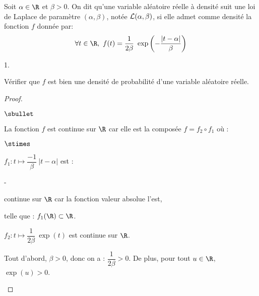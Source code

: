 \noindent 
Soit $\alpha\in\R$ et $\beta>0$. On dit qu'une variable aléatoire
réelle à densité suit une loi de Laplace de paramètre
$(\alpha,\beta)$, notée $\cal L(\alpha,\beta)$, si elle admet comme
densité la fonction $f$ donnée par:
\[
\forall t \in \R, \ f(t) = \dfrac{1}{2{\beta}} \ \exp\left(-
  \dfrac{|t-\alpha|}{\beta} \right)
\]
\begin{noliste}{1.}
  \setlength{\itemsep}{4mm}
\item Vérifier que $f$ est bien une densité de probabilité d'une
  variable aléatoire réelle.
  
  \begin{proof}~%
    \begin{noliste}{$\sbullet$}
    \item La fonction $f$ est continue sur $\R$ car elle est la 
    composée $f
      = f_2 \circ f_1$ où :
      \begin{noliste}{$\stimes$}
      \item $f_1 : t \mapsto \dfrac{-1}{\beta} \ |t - \alpha|$ est :
      \begin{noliste}{-}
        \item continue sur $\R$ car la fonction valeur absolue l'est,
        \item telle que : $f_1(\R) \subset \R$.
      \end{noliste}
      \item $f_2 : t \mapsto \dfrac{1}{2\beta} \ \exp(t)$ est continue 
      sur $\R$.        
      \end{noliste}

    \item Tout d'abord, $\beta > 0$, donc on a : $\dfrac{1}{2 \beta} >
      0$. De plus, pour tout $u \in \R$, $\exp(u) > 0$. %


\end{noliste}
\end{proof}
\end{noliste}
